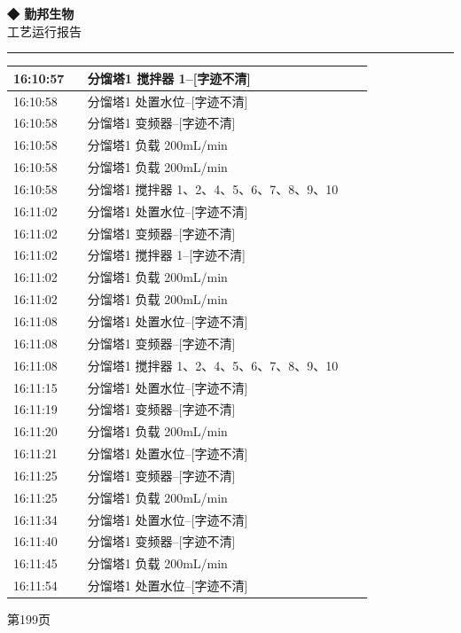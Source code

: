 \documentclass[UTF8,10pt,a4paper,fontset=fandol]{ctexart}
\begin{document}
\noindent
\begin{minipage}[t]{0.47\linewidth}
\centering
\textbf{◆ 勤邦生物}\\[2pt]
工艺运行报告\\[-2pt]
\rule{\linewidth}{0.4pt}

\scriptsize
\begin{tabular}{|p{0.19\linewidth}|p{0.73\linewidth}|}
\hline
16:10:57 & 分馏塔1 搅拌器 1--[字迹不清] \\ \hline
16:10:58 & 分馏塔1 处置水位--[字迹不清] \\ \hline
16:10:58 & 分馏塔1 变频器--[字迹不清] \\ \hline
16:10:58 & 分馏塔1 负载 200mL/min \\ \hline
16:10:58 & 分馏塔1 负载 200mL/min \\ \hline
16:10:58 & 分馏塔1 搅拌器 1、2、4、5、6、7、8、9、10 \\ \hline
16:11:02 & 分馏塔1 处置水位--[字迹不清] \\ \hline
16:11:02 & 分馏塔1 变频器--[字迹不清] \\ \hline
16:11:02 & 分馏塔1 搅拌器 1--[字迹不清] \\ \hline
16:11:02 & 分馏塔1 负载 200mL/min \\ \hline
16:11:02 & 分馏塔1 负载 200mL/min \\ \hline
16:11:08 & 分馏塔1 处置水位--[字迹不清] \\ \hline
16:11:08 & 分馏塔1 变频器--[字迹不清] \\ \hline
16:11:08 & 分馏塔1 搅拌器 1、2、4、5、6、7、8、9、10 \\ \hline
16:11:15 & 分馏塔1 处置水位--[字迹不清] \\ \hline
16:11:19 & 分馏塔1 变频器--[字迹不清] \\ \hline
16:11:20 & 分馏塔1 负载 200mL/min \\ \hline
16:11:21 & 分馏塔1 处置水位--[字迹不清] \\ \hline
16:11:25 & 分馏塔1 变频器--[字迹不清] \\ \hline
16:11:25 & 分馏塔1 负载 200mL/min \\ \hline
16:11:34 & 分馏塔1 处置水位--[字迹不清] \\ \hline
16:11:40 & 分馏塔1 变频器--[字迹不清] \\ \hline
16:11:45 & 分馏塔1 负载 200mL/min \\ \hline
16:11:54 & 分馏塔1 处置水位--[字迹不清] \\ \hline
\end{tabular}

\vspace{2pt}
{\tiny 第199页}
\end{minipage}
\end{document}
